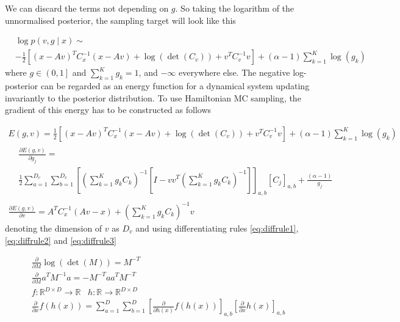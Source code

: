 \documentclass{paper}
\begin{document}
%
We can discard the terms not depending on $g$. So taking the logarithm of the unnormalised posterior, the sampling target will look like this

\begin{equation}
\begin{split}
&\log p(v,g \mid x) \sim \\ 
&-\frac{1}{2} \left[(x-Av)^T C_x^{-1} (x-Av) + \log(\det(C_v)) + v^T C_v^{-1} v\right] + (\alpha-1) \sum_{k=1}^K \log(g_k) \label{eq:log_post}
\end{split}
\end{equation}
%
where $g \in \left(0,1 \right]$ and $\sum_{k=1}^{K} g_k = 1$, and $-\infty$ everywhere else. The negative log-posterior can be regarded as an energy function for a dynamical system updating invariantly to the posterior distribution. To use Hamiltonian MC sampling, the gradient of this energy has to be constructed as follows

\begin{eqnarray}
E(g,v) = \frac{1}{2} \left[(x-Av)^T C_x^{-1} (x-Av) + \log(\det(C_v)) + v^T C_v^{-1} v\right] + (\alpha-1) \sum_{k=1}^K \log(g_k)\\
\begin{split}
&\frac{\partial E(g,v)}{\partial g_j} = \\
&\frac{1}{2} \sum_{a=1}^{D_v} \sum_{b=1}^{D_v} \left[ \left( \sum_{k=1}^K g_k C_k \right)^{-1} \left[ I - vv^T \left( \sum_{k=1}^K g_k C_k \right)^{-1} \right] \right]_{a,b} \left[ C_j \right]_{a,b} + \frac{(\alpha-1)}{g_j}
\end{split}\\
\frac{\partial E(g,v)}{\partial v} = A^T C_x^{-1}(Av-x) + \left( \sum_{k=1}^K g_k C_k \right)^{-1} v
\end{eqnarray}
%
denoting the dimension of $v$ as $D_v$ and using differentiating rules \ref{eq:diffrule1}, \ref{eq:diffrule2} and \ref{eq:diffrule3}

\begin{eqnarray}
\frac{\partial}{\partial M} \log(\det(M))= M^{-T} \label{eq:diffrule1}\\
\frac{\partial}{\partial M} a^T M^{-1} a = - M^{-T} aa^T M^{-T} \label{eq:diffrule2}\\
f: \mathbb{R}^{D \times D} \rightarrow \mathbb{R} \;\;\; h: \mathbb{R} \rightarrow \mathbb{R}^{D \times D} \nonumber\\
\frac{\partial}{\partial x} f(h(x)) = \sum_{a=1}^D \sum_{b=1}^D \left[ \frac{\partial}{\partial h(x)} f(h(x)) \right]_{a,b} \left[ \frac{\partial}{\partial x} h(x) \right]_{a,b} \label{eq:diffrule3}
\end{eqnarray}
\end{document}
